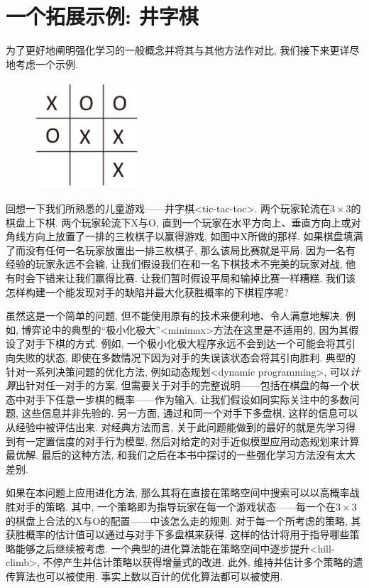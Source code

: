 \section{一个拓展示例: 井字棋}\label{sec:1.5}

为了更好地阐明强化学习的一般概念并将其与其他方法作对比, 我们接下来更详尽地考虑一个示例.

\begin{figure}
\centering
\includegraphics[width=4cm]{c1/img/tic-tac-toc.pdf}
\end{figure}
回想一下我们所熟悉的儿童游戏——井字棋<tic-tac-toc>. 两个玩家轮流在$3\times 3$的棋盘上下棋. 两个玩家轮流下\textsf{X}与\textsf{O}, 直到一个玩家在水平方向上、垂直方向上或对角线方向上放置了一排的三枚棋子以赢得游戏, 如图中X所做的那样. 如果棋盘填满了而没有任何一名玩家放置出一排三枚棋子, 那么该局比赛就是平局. 因为一名有经验的玩家永远不会输, 让我们假设我们在和一名下棋技术不完美的玩家对战, 他有时会下错来让我们赢得比赛. 让我们暂时假设平局和输掉比赛一样糟糕. 我们该怎样构建一个能发现对手的缺陷并最大化获胜概率的下棋程序呢?

虽然这是一个简单的问题, 但不能使用原有的技术来便利地、令人满意地解决. 例如, 博弈论中的典型的``极小化极大''<minimax>方法在这里是不适用的, 因为其假设了对手下棋的方式. 例如, 一个极小化极大程序永远不会到达一个可能会将其引向失败的状态, 即使在多数情况下因为对手的失误该状态会将其引向胜利. 典型的针对一系列决策问题的优化方法, 例如动态规划<dynamic programming>, 可以\emph{计算}出针对任一对手的方案, 但需要关于对手的完整说明——包括在棋盘的每一个状态中对手下任意一步棋的概率——作为输入. 让我们假设如同实际关注中的多数问题, 这些信息并非先验的. 另一方面, 通过和同一个对手下多盘棋, 这样的信息可以从经验中被评估出来. 对经典方法而言, 关于此问题能做到的最好的就是先学习得到有一定置信度的对手行为模型,  然后对给定的对手近似模型应用动态规划来计算最优解. 最后的这种方法, 和我们之后在本书中探讨的一些强化学习方法没有太大差别.

如果在本问题上应用进化方法, 那么其将在直接在策略空间中搜索可以以高概率战胜对手的策略. 其中, 一个策略即为指导玩家在每一个游戏状态——每一个在$3 \times 3$的棋盘上合法的\textsf{X}与\textsf{O}的配置——中该怎么走的规则. 对于每一个所考虑的策略, 其获胜概率的估计值可以通过与对手下多盘棋来获得. 这样的估计将用于指导哪些策略能够之后继续被考虑. 一个典型的进化算法能在策略空间中逐步提升<hill-climb>, 不停产生并估计策略以获得增量式的改进. 此外, 维持并估计多个策略的遗传算法也可以被使用. 事实上数以百计的优化算法都可以被使用.

